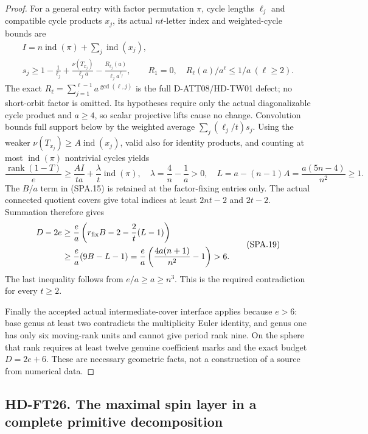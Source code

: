 \begin{proof}
For a general entry with factor permutation $\pi$, cycle lengths
$\ell_j$ and compatible cycle products $x_j$, its actual
$nt$-letter index and weighted-cycle bounds are
\[
 \begin{gathered}
 I=n\operatorname{ind}(\pi)+\sum_j\operatorname{ind}(x_j),\\
 s_j\ge1-\frac1{\ell_j}
       +\frac{\nu(T_{x_j})}{\ell_j a}
       -\frac{R_{\ell_j}(a)}{\ell_j a^{\ell_j}},\qquad
 R_1=0,\quad R_\ell(a)/a^\ell\le1/a\ (\ell\ge2).
 \end{gathered}
 \tag{SPA.17}
\]
The exact $R_\ell=\sum_{j=1}^{\ell-1}a^{\gcd(\ell,j)}$
is the full D-ATT08/HD-TW01 defect; no short-orbit factor is
omitted.  Its hypotheses require only the actual diagonalizable
cycle product and $a\ge4$, so scalar projective lifts cause
no change.  Convolution bounds full support below by the weighted
average $\sum_j(\ell_j/t)s_j$.  Using the weaker
$\nu(T_{x_j})\ge A\operatorname{ind}(x_j)$, valid also for
identity products, and counting at most $\operatorname{ind}(\pi)$
nontrivial cycles yields
\[
 \frac{\operatorname{rank}(1-T)}e
 \ge\frac{AI}{ta}+\frac\lambda t\operatorname{ind}(\pi),
 \quad\lambda=\frac4n-\frac1a>0,
 \quad L=a-(n-1)A=\frac{a(5n-4)}{n^2}\ge1.
 \tag{SPA.18}
\]
The $B/a$ term in (SPA.15) is retained at the factor-fixing
entries only.  The actual connected quotient covers give total
indices at least $2nt-2$ and $2t-2$.  Summation therefore gives
\[
 \begin{split}
 D-2e&\ge\frac ea\left(r_{\rm fix}B-2-\frac2t(L-1)\right)\\
     &\ge\frac ea(9B-L-1)
       =\frac ea\left(\frac{4a(n+1)}{n^2}-1\right)>6.
 \end{split}
 \tag{SPA.19}
\]
The last inequality follows from $e/a\ge a\ge n^3$.
This is the required contradiction for every $t\ge2$.

Finally the accepted actual intermediate-cover interface applies
because $e>6$: base genus at least two contradicts the multiplicity
Euler identity, and genus one has only six moving-rank units and
cannot give period rank nine.  On the sphere that rank requires
at least twelve genuine coefficient marks and the exact budget
$D=2e+6$.  These are necessary geometric facts, not a construction
of a source from numerical data.
\end{proof}

\subsection*{HD-FT26. The maximal spin layer in a complete primitive decomposition}

